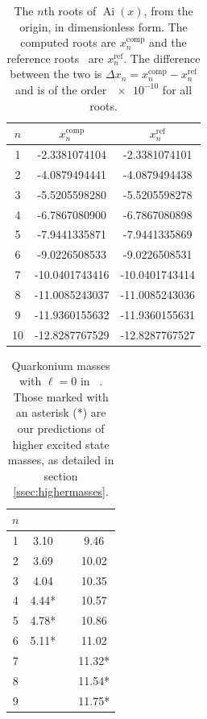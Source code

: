 \documentclass[]{article}
\newcommand{\Ai}[1]{\ensuremath{\operatorname{Ai}({#1})}}
\begin{document}
\begin{table}[H]
	\begin{center}
		\begin{tabular}{ c c c }
			$n$ & $x_{n}^{\mathrm{comp}}$ & $x_{n}^{\mathrm{ref}}$\\
			\hline
			1  & -2.3381074104  & -2.3381074101 \\
			2  & -4.0879494441  & -4.0879494438 \\
			3  & -5.5205598280  & -5.5205598278 \\
			4  & -6.7867080900  & -6.7867080898 \\
			5  & -7.9441335871  & -7.9441335869 \\
			6  & -9.0226508533  & -9.0226508531 \\
			7  & -10.0401743416 & -10.0401743414\\
			8  & -11.0085243037 & -11.0085243036\\
			9  & -11.9360155632 & -11.9360155631\\
			10 & -12.8287767529 & -12.8287767527
		\end{tabular}
		\caption{The $n$th roots of \Ai{x}, from the origin, in dimensionless form. The computed roots are $x_{n}^{\mathrm{comp}}$ and the reference roots~\cite{ref:abramowitz} are $x_{n}^{\mathrm{ref}}$. The difference between the two is $\Delta x_{n} = x_{n}^{\mathrm{comp}} - x_{n}^{\mathrm{ref}}$ and is of the order $\num{e-10}$ for all roots.}
		\label{tab:roots}
	\end{center}
\end{table}

\begin{table}[H]
	\begin{center}
		\begin{tabular}{ c c c c }
			$n$ & \ccbar & & \bbbar\\
			\hline
			1 & 3.10  & & 9.46 \\
			2 & 3.69  & & 10.02\\
			3 & 4.04  & & 10.35\\
			4 & 4.44* & & 10.57\\
			5 & 4.78* & & 10.86\\
			6 & 5.11* & & 11.02\\
			7 &       & & 11.32*\\
			8 &       & & 11.54*\\
			9 &       & & 11.75*\\
		\end{tabular}
		\caption{Quarkonium masses with $\ell = 0$ in \GeV~\cite{ref:gdaniell}. Those marked with an asterisk (*) are our predictions of higher excited state masses, as detailed in section \ref{ssec:highermasses}.}
		\label{tab:mesonmasses}
	\end{center}  
\end{table}
\end{document}
